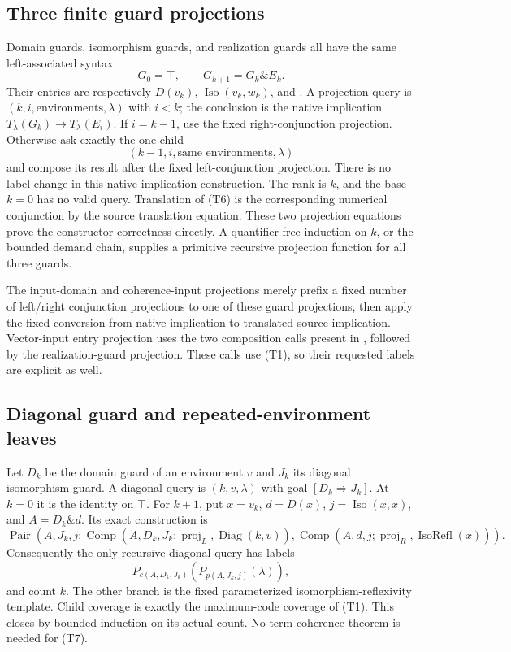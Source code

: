 \subsection{Three finite guard projections}

Domain guards, isomorphism guards, and realization guards all have the
same left-associated syntax
\[
 G_0=\top,\qquad G_{k+1}=G_k\mathbin{\&}E_k.                  \tag{T6}
\]
Their entries are respectively $D(v_k)$,
$\operatorname{Iso}(v_k,w_k)$, and
.  A projection query is
$(k,i,\text{environments},\lambda)$ with $i<k$; the conclusion is the
native implication $T_\lambda(G_k)\to T_\lambda(E_i)$.
If $i=k-1$, use the fixed right-conjunction projection.
Otherwise ask exactly the one child
\[
 (k-1,i,\text{same environments},\lambda)
\]
and compose its result after the fixed left-conjunction projection.
There is no label change in this native implication construction.
The rank is $k$, and the base $k=0$ has no valid query.  Translation
of (T6) is the corresponding numerical conjunction by the source
translation equation.  These two projection equations prove the
constructor correctness directly.  A quantifier-free induction on
$k$, or the bounded demand chain, supplies a primitive recursive
projection function for all three guards.

The input-domain and coherence-input projections merely prefix a
fixed number of left/right conjunction projections to one of these
guard projections, then apply the fixed conversion from native
implication to translated source implication.  Vector-input entry
projection uses the two composition calls present in
, followed
by the realization-guard projection.  These calls use (T1), so their
requested labels are explicit as well.

\subsection{Diagonal guard and repeated-environment leaves}

Let $D_k$ be the domain guard of an environment $v$ and $J_k$ its
diagonal isomorphism guard.  A diagonal query is
$(k,v,\lambda)$ with goal $[D_k\Rightarrow J_k]$.  At $k=0$ it is
the identity on $\top$.  For $k+1$, put
$x=v_k$, $d=D(x)$, $j=\operatorname{Iso}(x,x)$, and
$A=D_k\mathbin{\&}d$.  Its exact construction is
\[
 \operatorname{Pair}(A,J_k,j;
   \operatorname{Comp}(A,D_k,J_k;\operatorname{proj}_L,
                                    \operatorname{Diag}(k,v)),
   \operatorname{Comp}(A,d,j;\operatorname{proj}_R,
                                    \operatorname{IsoRefl}(x))).
 \tag{T7}
\]
Consequently the only recursive diagonal query has labels
\[
 P_{c(A,D_k,J_k)}(P_{p(A,J_k,j)}(\lambda)),
\]
and count $k$.  The other branch is the fixed parameterized
isomorphism-reflexivity template.  Child coverage is exactly the
maximum-code coverage of (T1).  This closes
 by bounded induction on its actual
count.  No term coherence theorem is needed for (T7).

